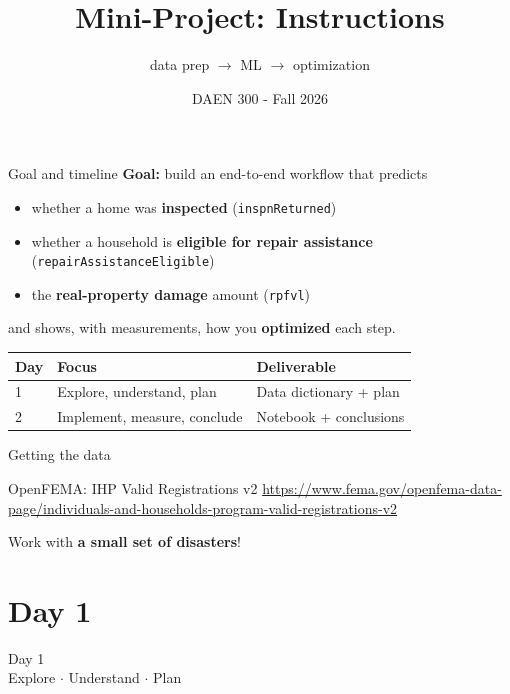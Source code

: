 \documentclass[aspectratio=43,11pt]{beamer}
\title{Mini-Project: Instructions}
\subtitle{data prep $\rightarrow$ ML $\rightarrow$ optimization}
\author{DAEN 300 - Fall 2026}
\date{}
\begin{document}
\begin{frame}
  \titlepage
\end{frame}

\begin{frame}{Goal and timeline}
  \textbf{Goal:} build an end-to-end workflow that predicts
  \begin{itemize}
    \item whether a home was \textbf{inspected} (\texttt{inspnReturned})
    \item whether a household is \textbf{eligible for repair assistance}
          (\texttt{repairAssistanceEligible})
    \item the \textbf{real-property damage} amount (\texttt{rpfvl})
  \end{itemize}
  and shows, with measurements, how you \textbf{optimized} each step.
  \vspace{0.8em}
  \begin{center}
  \begin{tabular}{@{}lll@{}}
    \toprule
    Day & Focus & Deliverable \\
    \midrule
    1 & Explore, understand, plan & Data dictionary + plan \\
    2 & Implement, measure, conclude & Notebook + conclusions \\
    \bottomrule
  \end{tabular}
  \end{center}
\end{frame}

\begin{frame}[fragile]{Getting the data}

OpenFEMA: IHP Valid Registrations v2
{\tiny\url{https://www.fema.gov/openfema-data-page/individuals-and-households-program-valid-registrations-v2}}

\vspace{0.5em}
          
Work with \textbf{a small set of disasters}!
\end{frame}

\section{Day 1}

\begin{frame}
  \centering
  \Huge Day 1 \\[0.5em]
  \large Explore $\cdot$ Understand $\cdot$ Plan
\end{frame}
\end{document}
